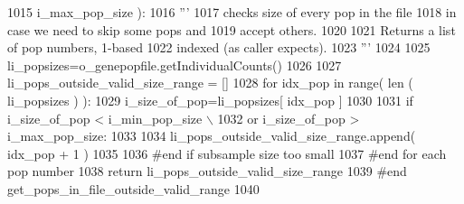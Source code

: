\begin{DoxyCode}
1015                                                 i\_max\_pop\_size ):
1016     \textcolor{stringliteral}{'''}
1017 \textcolor{stringliteral}{    checks size of every pop in the file}
1018 \textcolor{stringliteral}{    in case we need to skip some pops and }
1019 \textcolor{stringliteral}{    accept others.}
1020 \textcolor{stringliteral}{}
1021 \textcolor{stringliteral}{    Returns a list of pop numbers, 1-based}
1022 \textcolor{stringliteral}{    indexed (as caller expects).}
1023 \textcolor{stringliteral}{    '''}
1024 
1025     li\_popsizes=o\_genepopfile.getIndividualCounts()
1026 
1027     li\_pops\_outside\_valid\_size\_range = []
1028     \textcolor{keywordflow}{for} idx\_pop \textcolor{keywordflow}{in} range( len ( li\_popsizes ) ):
1029         i\_size\_of\_pop=li\_popsizes[ idx\_pop ] 
1030 
1031         \textcolor{keywordflow}{if} i\_size\_of\_pop < i\_min\_pop\_size \(\backslash\)
1032                 \textcolor{keywordflow}{or} i\_size\_of\_pop > i\_max\_pop\_size:
1033         
1034             li\_pops\_outside\_valid\_size\_range.append( idx\_pop + 1 )
1035 
1036         \textcolor{comment}{#end if subsample size too small}
1037     \textcolor{comment}{#end for each pop number}
1038     \textcolor{keywordflow}{return} li\_pops\_outside\_valid\_size\_range
1039 \textcolor{comment}{#end get\_pops\_in\_file\_outside\_valid\_range}
1040 
\end{DoxyCode}
